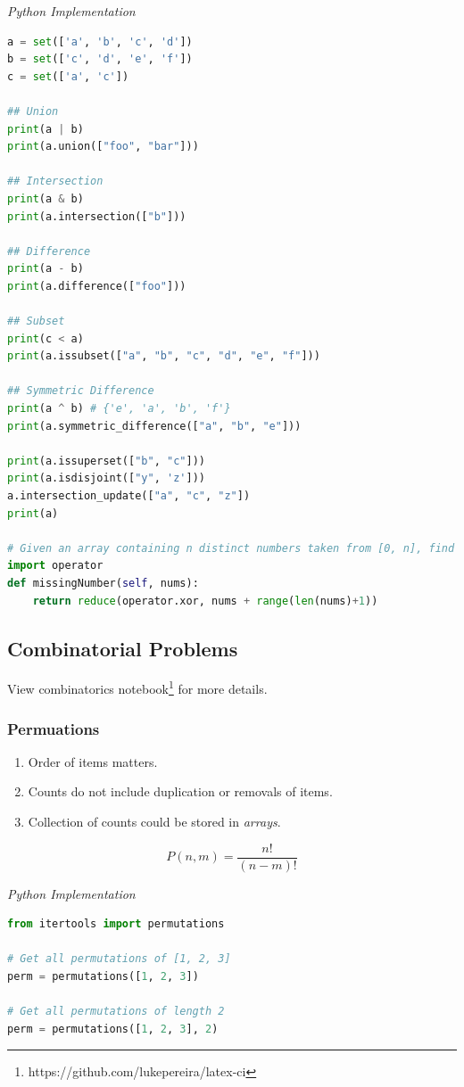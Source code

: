 \documentclass{article}
\begin{document}
    

\vspace{8pt} \emph{Python Implementation}
\begin{lstlisting}[language=Python]
a = set(['a', 'b', 'c', 'd'])
b = set(['c', 'd', 'e', 'f'])
c = set(['a', 'c'])

## Union
print(a | b)
print(a.union(["foo", "bar"]))

## Intersection
print(a & b)
print(a.intersection(["b"]))

## Difference
print(a - b)
print(a.difference(["foo"]))

## Subset
print(c < a)
print(a.issubset(["a", "b", "c", "d", "e", "f"]))

## Symmetric Difference
print(a ^ b) # {'e', 'a', 'b', 'f'}
print(a.symmetric_difference(["a", "b", "e"]))

print(a.issuperset(["b", "c"]))
print(a.isdisjoint(["y", 'z']))
a.intersection_update(["a", "c", "z"])
print(a)

# Given an array containing n distinct numbers taken from [0, n], find the one that is missing from the array.
import operator
def missingNumber(self, nums):
    return reduce(operator.xor, nums + range(len(nums)+1))
\end{lstlisting}    

\subsection{Combinatorial Problems}

    View combinatorics notebook\footnote{https://github.com/lukepereira/latex-ci} for more details.

    \subsubsection{Permuations}
    \begin{enumerate}
        \item Order of items matters.
        \item Counts do not include duplication or removals of items.
        \item Collection of counts could be stored in \emph{arrays}. 
    \end{enumerate} 
    
    \[
    P(n,m) = \frac{n!}{(n-m)!}
    \]

    
\vspace{8pt} \emph{Python Implementation}
\begin{lstlisting}[language=Python]
from itertools import permutations 

# Get all permutations of [1, 2, 3] 
perm = permutations([1, 2, 3])   

# Get all permutations of length 2 
perm = permutations([1, 2, 3], 2) 
\end{lstlisting} 
\end{document}
